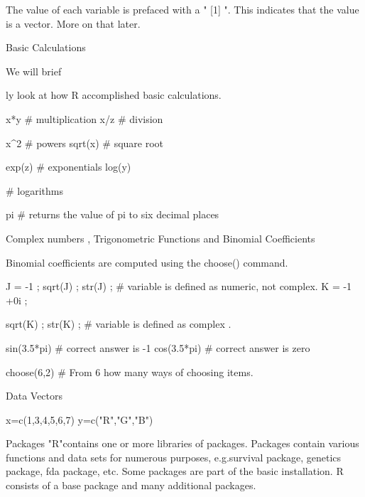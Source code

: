 \begin{frame}
The value of each variable is prefaced with a " [1] ". This indicates that the value is a vector. More on that later.




Basic Calculations

We will brief\begin{frame}ly look at how R accomplished basic calculations.


x*y			# multiplication
x/z			# division

x^2			# powers
sqrt(x)		# square root

exp(z)		 # exponentials   
log(y)\end{frame}		 # logarithms

pi             # returns the value of pi to six decimal places

 
Complex numbers , Trigonometric  Functions and Binomial Coefficients
 
Binomial coefficients are computed using the choose() command.


 

J = -1 ;  sqrt(J)  ;  str(J) ;      # variable is defined as numeric, not complex.
K = -1 +0i ;\begin{frame}  sqrt(K)  ;  str(K) ;  # variable is defined as complex .


sin(3.5*pi)             # correct answer is -1
cos(3.5*pi)             # correct answer is zero
 
choose(6,2)             # From 6 how many ways of choosing items.
 
Data Vectors

x=c(1,3,4,5,6,7)
y=c("R","G","B")

\end{frame}
\begin{frame}




Packages
"R"contains one or more libraries of packages. Packages contain various functions and data sets for numerous purposes, e.g.survival package, genetics package, fda package, etc. Some packages are part of the basic installation. 
R consists of a base package and many additional packages.


\end{frame}
\end{frame}

